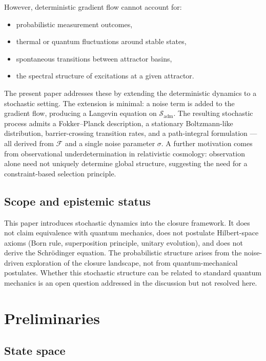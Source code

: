 \documentclass[12pt]{article}
\newcommand{\Fcal}{\mathcal{F}}
\newcommand{\Sadm}{\mathcal{S}_{\mathrm{adm}}}
\begin{document}
However, deterministic gradient flow cannot account for:
\begin{itemize}
    \item probabilistic measurement outcomes,
    \item thermal or quantum fluctuations around stable states,
    \item spontaneous transitions between attractor basins,
    \item the spectral structure of excitations at a given attractor.
\end{itemize}

The present paper addresses these by extending the deterministic dynamics to a stochastic setting. The extension is minimal: a noise term is added to the gradient flow, producing a Langevin equation on $\Sadm$. The resulting stochastic process admits a Fokker--Planck description, a stationary Boltzmann-like distribution, barrier-crossing transition rates, and a path-integral formulation --- all derived from $\Fcal$ and a single noise parameter $\sigma$. A further motivation comes from observational underdetermination in relativistic cosmology: observation alone need not uniquely determine global structure, suggesting the need for a constraint-based selection principle.

\subsection*{Scope and epistemic status}

This paper introduces stochastic dynamics into the closure framework. It does not claim equivalence with quantum mechanics, does not postulate Hilbert-space axioms (Born rule, superposition principle, unitary evolution), and does not derive the Schr\"odinger equation. The probabilistic structure arises from the noise-driven exploration of the closure landscape, not from quantum-mechanical postulates. Whether this stochastic structure can be related to standard quantum mechanics is an open question addressed in the discussion but not resolved here.

\section{Preliminaries}\label{sec:prelim}

\subsection{State space}
\end{document}
